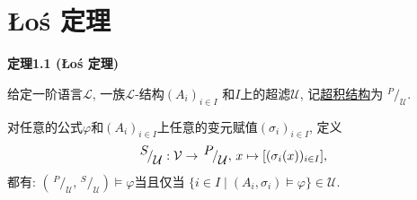 


\setlength{\abovedisplayskip}{1pt}
\setlength{\belowdisplayskip}{1pt}

\section{Łoś 定理}

\hypertarget{sec:定理1.1}{}
\noindent\textbf{定理1.1 (Łoś 定理)}

给定一阶语言$\mathcal{L}$, 一族$\mathcal{L}$-结构$(A_i)_{i\in I}$
和$I$上的超滤$\mathcal{U}$, 记\href{01 超积结构#nameddest=sec:定义2.1}{超积结构}为
$^{\displaystyle P}\!/_{\displaystyle\mathcal{U}}$.

对任意的公式$\varphi$和$(A_i)_{i\in I}$上任意的变元赋值$(\sigma_i)_{i\in I}$, 定义
\[
    ^{\displaystyle S}\!/_{\displaystyle\mathcal{U}}:
    \mathcal{V}\to\,^{\displaystyle P}\!/_{\displaystyle\mathcal{U}},\,
    x\mapsto[(\sigma_i(x))_{i\in I}],\\[3pt]
\]
都有: $\left(\,^{\displaystyle P}\!/_{\displaystyle\mathcal{U}},\,
^{\displaystyle S}\!/_{\displaystyle\mathcal{U}}\right)\models\varphi$当且仅当
$\{i\in I\mid(A_i,\sigma_i)\models\varphi\}\in\mathcal{U}$.


